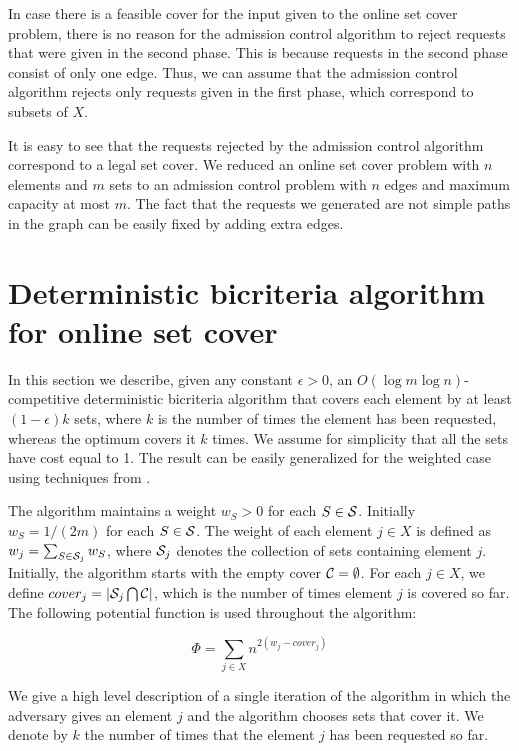 \documentclass{sig-alternate}
\def \CC   {{\cal C}}
\def \SS   {{\cal S}}
\begin{document}
In case there is a feasible cover for the input given to the
online set cover problem, there is no reason for the admission
control algorithm to reject requests that were given in the second
phase. This is because requests in the second phase consist of
only one edge. Thus, we can assume that the admission control
algorithm rejects only requests given in the first phase, which
correspond to subsets of $X$.

It is easy to see that the requests rejected by the admission
control algorithm correspond to a legal set cover. We reduced an
online set cover problem with $n$ elements and $m$ sets to an
admission control problem with $n$ edges and maximum capacity at
most $m$. The fact that the requests we generated are not simple
paths in the graph can be easily fixed by adding extra edges.

\section{Deterministic bicriteria algorithm for online set cover}\label{sec:det}

In this section we describe, given any constant $\epsilon > 0$, an
$O(\log m \log n)$-competitive deterministic bicriteria algorithm
that covers each element by at least $(1-\epsilon)k$ sets, where
$k$ is the number of times the element has been requested, whereas
the optimum covers it $k$ times. We assume for simplicity that all
the sets have cost equal to 1. The result can be easily
generalized for the weighted case using techniques from
\cite{AAABN03}.

The algorithm maintains a weight $w_S > 0$ for each $S \in \SS$.
Initially $w_S = 1/(2m)$ for each $S \in \SS$. The weight of each
element $j \in X$ is defined as $w_j = \sum_{S \in \SS_j} w_S$,
where $\SS_j$ denotes the collection of sets containing element
$j$. Initially, the algorithm starts with the empty cover $\CC =
\emptyset$. For each $j \in X$, we define $cover_j = |\SS_j
\bigcap \CC|$, which is the number of times element $j$ is covered
so far. The following potential function is used throughout the
algorithm:

$$ \Phi = \sum_{j \in X} n^{2(w_j - cover_j)}$$

We give a high level description of a single iteration of the
algorithm in which the adversary gives an element $j$ and the
algorithm chooses sets that cover it. We denote by $k$ the number
of times that the element $j$ has been requested so far.
\end{document}
